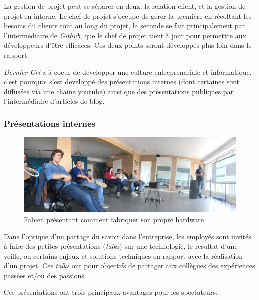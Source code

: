 \documentclass[12pt,a4paper]{article}
\begin{document}
  \bigskip

  La gestion de projet peut se séparer en deux: la relation client, et la
  gestion de projet en interne. Le chef de projet s'occupe de gérer la
  première en récoltant les besoins du clients tout au long du projet, la
  seconde se fait principalement par l'intermédiaire de \emph{Github}, que
  le chef de projet tient à jour pour permettre aux développeurs d'être
  efficaces. Ces deux points seront développés plus loin dans le rapport.

  \bigskip

  \emph{Dernier Cri} a à coeur de développer une culture entreprenariale
  et informatique, c'est pourquoi s'est developpé des présentations
  internes (dont certaines sont diffusées via une chaine youtube) ainsi
  que des présentations publiques par l'intermédiaire d'articles de blog.

  \subsubsection{Présentations internes}\label{pruxe9sentations-internes}

  \begin{figure}[h]
    \centering
    \includegraphics[height=4cm]{figures/talk.jpg}
    \caption{Fabien présentant comment fabriquer son propre hardware}
  \end{figure}

  \bigskip

  Dans l'optique d'un partage du savoir dans l'entreprise, les employés
  sont invités à faire des petites présentations (\emph{talks}) sur une
  technologie, le resultat d'une veille, ou certains enjeux et solutions
  techniques en rapport avec la réalisation d'un projet. Ces \emph{talks}
  ont pour objectifs de partager aux collègues des expériences passées
  et/ou des passions.

  \bigskip

  Ces présentations ont trois principaux avantages pour les spectateurs:
\end{document}
